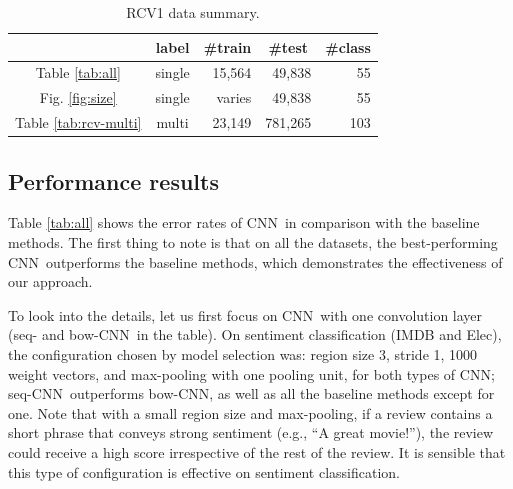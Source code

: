 \documentclass[11pt,letterpaper]{article}
\newcommand{\cnn}{CNN}
\newcommand{\scnnpfx}{seq}
\newcommand{\scnn}{seq-CNN}
\newcommand{\bcnn}{bow-CNN}
\newcommand{\Elec}{Elec}
\begin{document}
\begin{table}
\begin{center}
\begin{footnotesize}
\begin{tabular}{|c|c|r|r|r|} 
\hline
   & label          &\multicolumn{1}{|c|}{\#train}&\multicolumn{1}{|c|}{\#test}& \#class \\
\hline
Table \ref{tab:all}  & single  & 15,564 & 49,838 & 55 \\%
\hline
Fig. \ref{fig:size}  & single  & varies &  %
                                          49,838 & 55 \\%
\hline                                                                
Table \ref{tab:rcv-multi}   & multi   & 23,149 & 781,265 & 103 \\
\hline
\end{tabular}
\end{footnotesize}
\vspace{-0.1in}
\caption{ \label{tab:rcv-data} \small 
RCV1 data summary.  
}
\end{center}
\end{table}

\subsection{Performance results}
Table \ref{tab:all} shows the error rates of \cnn\ in comparison with 
the baseline methods. %
The first thing to note is that on all the datasets, 
the best-performing \cnn\ outperforms the baseline methods, 
which demonstrates the effectiveness of our approach.  
  
To look into the details, 
let us first focus on \cnn\ with one convolution layer 
(\scnnpfx- and \bcnn\ in the table).  
On sentiment classification (IMDB and \Elec), 
the configuration chosen by model selection %
was: region size 3, stride 1, 1000 weight vectors, and max-pooling 
with one pooling unit, for both types of \cnn; 
\scnn\ outperforms \bcnn, as well as all the baseline methods except for one.  
Note that with a small region size and max-pooling, 
if a review contains a short phrase that conveys strong sentiment 
(e.g., ``A great movie!''), the review could receive a high score irrespective of the rest of the review. 
It is sensible that this type of configuration is effective on sentiment classification.  
\end{document}
